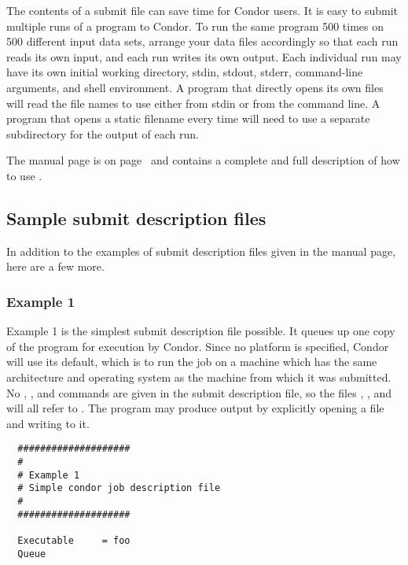 The contents of a submit file
can save time for Condor users.
It is easy to submit multiple runs of a program to
Condor. To run the same program 500 times on 500
different input data sets, arrange your data files
accordingly so that each run reads its own input, and each run
writes its own output.
Each individual run may have its own initial
working directory, stdin, stdout, stderr, command-line arguments, and
shell environment.
A program that directly opens its own
files will read the file names to use either from stdin
or from the command line. 
A program that opens a static filename every time
will need to use a separate subdirectory for the output of each run.

The  manual page 
is on page~\pageref{man-condor-submit} and
contains a complete and full description of how to use .

\subsection{Sample submit description files}  

In addition to the examples of submit description files given
in the 
 manual page, here are a few more.

\subsubsection{Example 1} 

Example 1 is the simplest submit description
file possible. It queues up one copy of the program  for execution
by Condor.
Since no platform is specified, Condor will use its default,
which is to run the job on a machine which has the
same architecture and operating system as the machine from which it was
submitted. 
No 
,
, and
commands are given in the submit
description file, so the
files , , and  will all refer to 
.
The program may produce output by explicitly opening a file and writing to
it.
\begin{verbatim}
  ####################                                                    
  # 
  # Example 1                                                                       
  # Simple condor job description file                                    
  #                                                                       
  ####################                                                    
                                                                          
  Executable     = foo                                                    
  Queue    
\end{verbatim}

